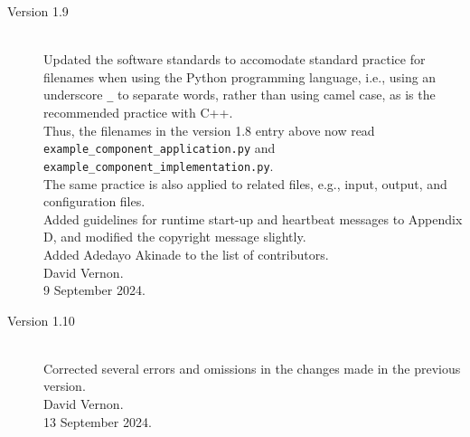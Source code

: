 \documentclass{CSSRforAfrica}
\begin{document}
\begin{description}
\item [Version 1.9]~\\
Updated the software standards to accomodate standard practice for filenames when using the Python programming language, i.e., using an underscore {\small \verb+_+} to separate words, rather than using camel case, as is the recommended practice with C++.\\
Thus, the filenames in the version 1.8 entry above now read \\
{\small \verb+example_component_application.py+} and {\small \verb+example_component_implementation.py+}. \\
The same practice is also applied to related files, e.g., input, output, and configuration files.\\
Added guidelines for runtime start-up and  heartbeat messages to Appendix D, and modified the copyright message slightly.\\
Added Adedayo Akinade to the list of contributors.\\     
David Vernon. \\       
9 September 2024. 

\item [Version 1.10]~\\
Corrected several errors and omissions in the changes made in the previous version.\\     
David Vernon. \\       
13 September 2024.
\end{description}
\end{document}
